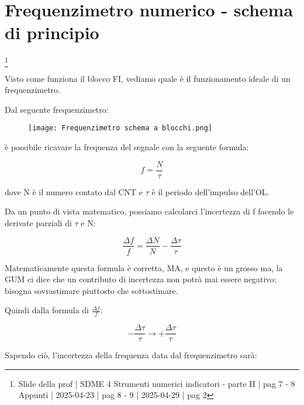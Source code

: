 \newpage 

\section{Frequenzimetro numerico - schema di principio}
\footnote{Slide della prof | SDME 4 Strumenti numerici indicatori - parte II | pag 7 - 8 \\  
Appunti | 2025-04-23 | pag 8 - 9 | 2025-04-29 | pag 2}

Visto come funziona il blocco FI, vediamo quale è il funzionamento ideale di un frequenzimetro. \newline 

Dal seguente frequenzimetro: 

\begin{figure}[h]
    \centering
    \texttt{[image: Frequenzimetro schema a blocchi.png]}
\end{figure}

è possibile ricavare la frequenza del segnale con la seguente formula: 

{
    \Large 
    \begin{equation}
        f = \frac{N}{\tau}
    \end{equation}
}

dove N è il numero contato dal CNT e $\tau$ è il periodo dell'impulso dell'OL. \newline 

Da un punto di vista matematico, 
possiamo calcolarci l'incertezza di f facendo le derivate parziali di $\tau$ e N: 

{
    \Large 
    \begin{equation}
        \frac{\Delta f}{f}
        =
        \frac{\Delta N}{N}
        - 
        \frac{\Delta \tau}{\tau}
    \end{equation}
}

Matematicamente questa formula è corretta, 
MA, e questo è un grosso ma, la GUM ci dice che un contributo 
di incertezza non potrà mai essere negativo: 
bisogna sovrastimare piuttosto che sottostimare. \newline 

Quindi dalla formula di $\frac{\Delta f}{f}$: 

{
    \Large 
    \begin{equation}
        - 
        \frac{\Delta \tau}{\tau}
        \rightarrow
        + 
        \frac{\Delta \tau}{\tau}
    \end{equation}
}

Sapendo ciò, 
l'incertezza della frequenza data dal frequenzimetro sarà:

